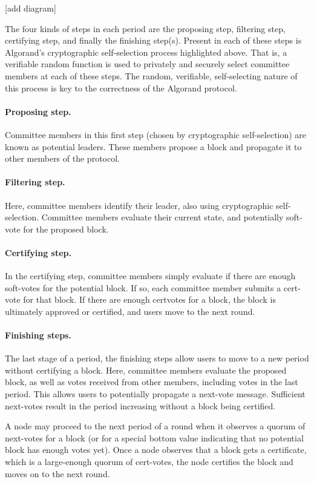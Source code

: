[add diagram]

The four kinds of steps in each period are the proposing step, filtering step, certifying step, and finally the finishing step(s). Present in each of these steps is Algorand's cryptographic self-selection process highlighted above. That is, a verifiable random function is used to privately and securely select committee members at each of these steps. The random, verifiable, self-selecting nature of this process is key to the correctness of the Algorand protocol.

\paragraph{Proposing step.} Committee members in this first step (chosen by cryptographic self-selection) are known as potential leaders. These members propose a block and propagate it to other members of the protocol.

\paragraph{Filtering step.} Here, committee members identify their leader, also using cryptographic self-selection. Committee members evaluate their current state, and potentially soft-vote for the proposed block.

\paragraph{Certifying step.} In the certifying step, committee members simply evaluate if there are enough soft-votes for the potential block. If so, each committee member submits a cert-vote for that block. If there are enough certvotes for a block, the block is ultimately approved or certified, and users move to the next round.

\paragraph{Finishing steps.} The last stage of a period, the finishing steps allow users to move to a new period without certifying a block. Here, committee members evaluate the proposed block, as well as votes received from other members, including votes in the last period. This allows users to potentially propagate a next-vote message. Sufficient next-votes result in the period increasing without a block being certified.

A node may proceed to the next period of a round when it observes a quorum of next-votes for a block (or for a special bottom value indicating that no potential block has enough votes yet). Once a node observes that a block gets a certificate, which is a large-enough quorum of cert-votes, the node certifies the block and moves on to the next round.

